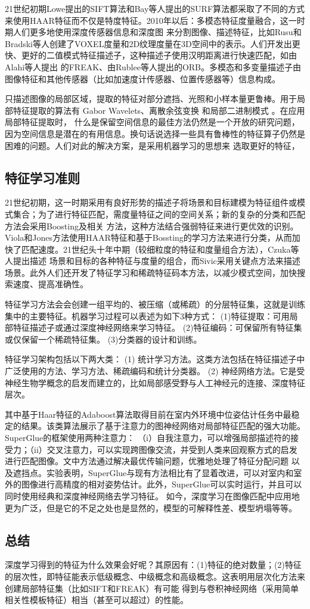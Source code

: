 21世纪初期Lowe提出的SIFT\cite{lowe2004distinctive}算法和Bay等人提出的SURF\cite{bay2008speeded}算法都采取了不同的方式来使用HAAR特征而不仅是特度特征。2010年以后：多模态特征度量融合，这一时期人们更多地使用深度传感器信息和深度图
来分割图像、描述特征，比如Rusu和Bradski等人创建了VOXEL度量\cite{rusu2010fast}和2D纹理度量在3D空间中的表示。人们开发出更快、更好的二值模式特征描述子，这种描述子使用汉明距离进行快速匹配，如由Alahi等人提出
的FREAK\cite{alahi2012freak}、由Rublee等人提出的ORB\cite{rublee2011orb}。多模态和多变量描述子由图像特征和其他传感器（比如加速度计传感器、位置传感器等）信息构成。

只描述图像的局部区域，提取的特征对部分遮挡、光照和小样本量更鲁棒。用于局部特征提取的算法有 Gabor Wavelets\cite{belhumeur1966recognition}、离散余弦变换\cite{messer2006performance} 和局部二进制模式 \cite{ahonen2004face}。在应用局部特征提取时，
什么是保留空间信息的最佳方法仍然是一个开放的研究问题，因为空间信息是潜在的有用信息。换句话说选择一些具有鲁棒性的特征算子仍然是困难的问题。人们对此的解决方案，是采用机器学习的思想来
选取更好的特征，

\subsection{特征学习准则}

21世纪初期，这一时期采用有良好形势的描述子将场景和目标建模为特征组件或模式集合；为了进行特征匹配，需度量特征之间的空间关系；新的复杂的分类和匹配方法会采用Boosting及相关
方法，这种方法结合强弱特征来进行更优效的识别。Viola和Jones方法\cite{viola2001rapid}使用HAAR特征和基于Bossting的学习方法来进行分类，从而加快了匹配速度。21世纪头十年中期（较细粒度的特征和度量组合方法），Czuka等人\cite{csurka2004visual}提出描述
场景和目标的各种特征与度量的组合，而Sivic采用关键点方法来描述场景。此外人们还开发了特征学习和稀疏特征码本方法，以减少模式空间，加快搜索速度、提高准确性。

特征学习方法会会创建一组平均的、被压缩（或稀疏）的分层特征集，这就是训练集中的主要特征。机器学习过程可以表述为如下3种方式：
(1)特征提取：可用局部特征描述子或通过深度神经网络来学习特征。
(2)特征编码：可保留所有特征集或仅保留一个稀疏特征集。
(3)分类器的设计和训练。

特征学习架构包括以下两大类：
(1) 统计学习方法。这类方法包括在特征描述子中广泛使用的方法、学习方法、稀疏编码和统计分类器。
(2) 神经网络方法。它是受神经生物学概念的启发而建立的，比如局部感受野与人工神经元的连接、深度特征层次。

其中基于Haar特征的Adaboost算法取得目前在室内外环境中位姿估计任务中最稳定的结果。该类算法展示了基于注意力的图神经网络对局部特征匹配的强大功能。 SuperGlue的框架使用两种注意力\cite{sarlin2020superglue}：
（i）自我注意力，可以增强局部描述符的接受力；（ii）交叉注意力，可以实现跨图像交流，并受到人类来回观察方式的启发进行匹配图像。文中方法通过解决最优传输问题，优雅地处理了特征分配问题
以及遮挡点。实验表明，SuperGlue与现有方法相比有了显着改进，可以对室内和室外的图像进行高精度的相对姿势估计。此外，SuperGlue可以实时运行，并且可以同时使用经典和深度神经网络去学习特征。
如今，深度学习在图像匹配中应用地更为广泛，但是它的不足之处也是显然的，模型的可解释性差、模型坍塌等等。

\subsection{总结}

深度学习得到的特征为什么效果会好呢？其原因有：(1)特征的绝对数量；(2)特征的层次性，即特征能表示低级概念、中级概念和高级概念。这表明用层次化方法来创建局部特征集（比如SIFT和FREAK）有可能
得到与卷积神经网络（采用简单相关性模板特征）相当（甚至可以超过）的性能。